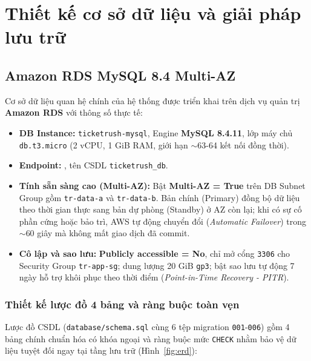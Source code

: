 \chapter[Cơ sở dữ liệu và lưu trữ]{Thiết kế cơ sở dữ liệu và giải pháp lưu trữ}

\section{Amazon RDS MySQL 8.4 Multi-AZ}
Cơ sở dữ liệu quan hệ chính của hệ thống được triển khai trên dịch vụ quản trị \textbf{Amazon RDS} với thông số thực tế:
\begin{itemize}[leftmargin=1.5em]
  \item \textbf{DB Instance:} \texttt{ticketrush-mysql}, Engine \textbf{MySQL 8.4.11}, lớp máy chủ \texttt{db.t3.micro} (2 vCPU, 1 GiB RAM, giới hạn $\sim$63-64 kết nối đồng thời).
  \item \textbf{Endpoint:} , tên CSDL \texttt{ticketrush\_db}.
  \item \textbf{Tính sẵn sàng cao (Multi-AZ):} Bật \textbf{Multi-AZ = True} trên DB Subnet Group gồm \texttt{tr-data-a} và \texttt{tr-data-b}. Bản chính (Primary) đồng bộ dữ liệu theo thời gian thực sang bản dự phòng (Standby) ở AZ còn lại; khi có sự cố phần cứng hoặc bảo trì, AWS tự động chuyển đổi (\textit{Automatic Failover}) trong $\sim 60$ giây mà không mất giao dịch đã commit.
  \item \textbf{Cô lập và sao lưu:} \textbf{Publicly accessible = No}, chỉ mở cổng \texttt{3306} cho Security Group \texttt{tr-app-sg}; dung lượng 20 GiB \texttt{gp3}; bật sao lưu tự động 7 ngày hỗ trợ khôi phục theo thời điểm (\textit{Point-in-Time Recovery - PITR}).
\end{itemize}

\subsection{Thiết kế lược đồ 4 bảng và ràng buộc toàn vẹn}
Lược đồ CSDL (\texttt{database/schema.sql} cùng 6 tệp migration \texttt{001}-\texttt{006}) gồm 4 bảng chính chuẩn hóa có khóa ngoại và ràng buộc mức \texttt{CHECK} nhằm bảo vệ dữ liệu tuyệt đối ngay tại tầng lưu trữ (Hình~\ref{fig:erd}):

